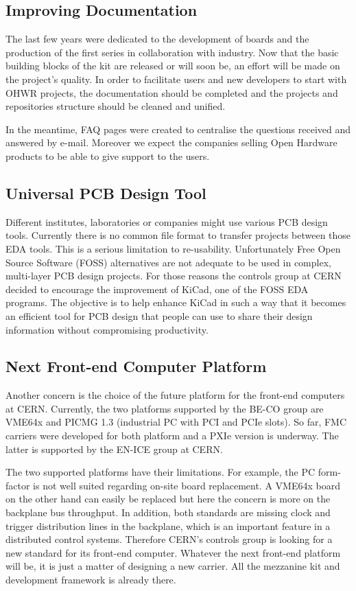 \documentclass{JAC2003}
\begin{document}
\subsection{Improving Documentation}
The last few years were dedicated to the development of boards and the production of the first series in collaboration with industry.
Now that the basic building blocks of the kit are released or will soon be, an effort will be made on the project's quality.
In order to facilitate users and new developers to start with OHWR projects, the documentation should be completed and the projects and repositories structure should be cleaned and unified.

In the meantime, FAQ pages were created to centralise the questions received and answered by e-mail.
Moreover we expect the companies selling Open Hardware products to be able to give support to the users.

\subsection{Universal PCB Design Tool}
Different institutes, laboratories or companies might use various PCB design tools.
Currently there is no common file format to transfer projects between those EDA tools.
This is a serious limitation to re-usability.
Unfortunately Free Open Source Software (FOSS) alternatives are not adequate to be used in complex, multi-layer PCB design projects.
For those reasons the controls group at CERN decided to encourage the improvement of KiCad, one of the FOSS EDA programs.
The objective is to help enhance KiCad in such a way that it becomes an efficient tool for PCB design that people can use to share their design information without compromising productivity.

\subsection{Next Front-end Computer Platform}
Another concern is the choice of the future platform for the front-end computers at CERN.
Currently, the two platforms supported by the BE-CO group are VME64x and PICMG 1.3 (industrial PC with PCI and PCIe slots).
So far, FMC carriers were developed for both platform and a PXIe version is underway.
The latter is supported by the EN-ICE group at CERN.

The two supported platforms have their limitations.
For example, the PC form-factor is not well suited regarding on-site board replacement.
A VME64x board on the other hand can easily be replaced but here the concern is more on the backplane bus throughput.
In addition, both standards are missing clock and trigger distribution lines in the backplane, which is an important feature in a distributed control systems.
Therefore CERN's controls group is looking for a new standard for its front-end computer.
Whatever the next front-end platform will be, it is just a matter of designing a new carrier. All the mezzanine kit and development framework is already there.
\end{document}
